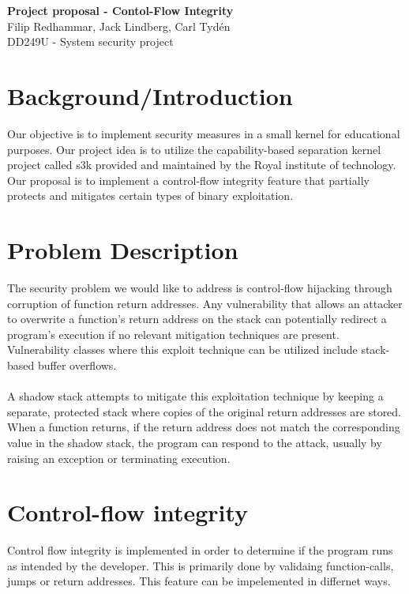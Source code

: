 \documentclass[11pt]{article}
\begin{document}
\begin{center}
    \textbf{\Large Project proposal - Contol-Flow Integrity} \\
    \vspace{0.2cm}
    Filip Redhammar, Jack Lindberg, Carl Tydén \\
    DD249U - System security project
\end{center}
\vspace{-0.2cm}
\section*{Background/Introduction}
Our objective is to implement security measures in a small kernel for educational purposes. Our project idea is to utilize the capability-based separation kernel project called s3k provided and maintained by the Royal institute of technology. Our proposal is to implement a control-flow integrity feature that partially protects and mitigates certain types of binary exploitation.

\section*{Problem Description}
The security problem we would like to address is control-flow hijacking through corruption of function return addresses. Any vulnerability that allows an attacker to overwrite a function's return address on the stack can potentially redirect a program's execution if no relevant mitigation techniques are present. Vulnerability classes where this exploit technique can be utilized include stack-based buffer overflows.
\\
\\
A shadow stack attempts to mitigate this exploitation technique by keeping a separate, protected stack where copies of the original return addresses are stored. When a function returns, if the return address does not match the corresponding value in the shadow stack, the program can respond to the attack, usually by raising an exception or terminating execution.

\section*{Control-flow integrity}
Control flow integrity is implemented in order to determine if the program runs as intended by the developer. This is primarily done by validaing function-calls, jumps or return addresses. This feature can be impelemented in differnet ways.  
\end{document}
